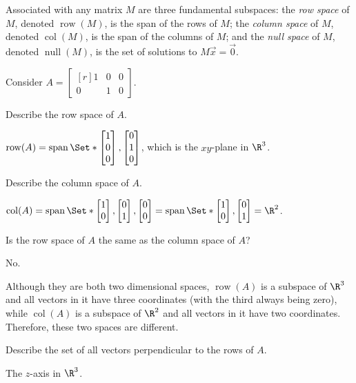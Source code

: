 \documentclass{problemset}
\DeclareMathOperator{\Span}{span}
\DeclareMathOperator{\Null}{null}
\DeclareMathOperator{\Row}{row}
\DeclareMathOperator{\Col}{col}
\newcommand{\mat}[1]{\begin{bmatrix*}[r]#1\end{bmatrix*}}
\begin{document}
	\begin{definition}
		Associated with any matrix $M$ are three fundamental subspaces: 
		the \emph{row space} of $M$, denoted $\Row(M)$, is the span of the rows of $M$; 
		the \emph{column space} of $M$, denoted $\Col(M)$, is the span of the columns of $M$;
		and the \emph{null space} of $M$, denoted $\Null(M)$, is the set of solutions to $M\vec x=\vec 0$. 
	\end{definition}

	\question
	\label{fundamentalSubspaces}
	Consider $A=\mat{1&0&0\\0&1&0}$.
	\begin{parts}
		\item Describe the row space of $A$.
			\begin{solution}
				$\Row(A) = \Span\Set*{\mat{1\\0\\0},\mat{0\\1\\0}}$,
				which is the $xy$-plane in $\R^3$. 
			\end{solution}
		\item Describe the column space of $A$.
			\begin{solution}
				$\Col(A)=\Span\Set*{\mat{1\\0},\mat{0\\1},\mat{0\\0}}
					=\Span\Set*{\mat{1\\0},\mat{0\\1}}=\R^2$.
			\end{solution}
		\item Is the row space of $A$ the same as the column space of $A$?
			\begin{solution}
				No. 

				Although they are both two dimensional spaces, $\Row(A)$ is a
				subspace of $\R^3$ and all vectors in it have three coordinates 
				(with the third always being zero), while $\Col(A)$ is a
				subspace of $\R^2$ and all vectors in it have two coordinates. 
				Therefore, these two spaces are different.
			\end{solution}
		\item Describe the set of all vectors perpendicular to the rows of $A$.
			\begin{solution}
				The $z$-axis in $\R^3$. 


\end{solution}
\end{parts}
\end{document}
